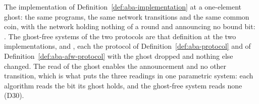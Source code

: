 \begin{definition}
  \label{def:aba-ghost-free}
  \leanok
  The implementation of Definition~\ref{def:aba-implementation} at a one-element ghost: the same programs, the same network transitions and the same common coin, with the network holding nothing of a round and announcing no bound bit: .
  The ghost-free systems of the two protocols are that definition at the two implementations,  and , each the protocol of Definition~\ref{def:aba-protocol} and of Definition~\ref{def:aba-afw-protocol} with the ghost dropped and nothing else changed.
  The read of the ghost enables the announcement and no other transition, which is what puts the three readings in one parametric system: each algorithm reads the bit its ghost holds, and the ghost-free system reads none (D30).
\end{definition}
